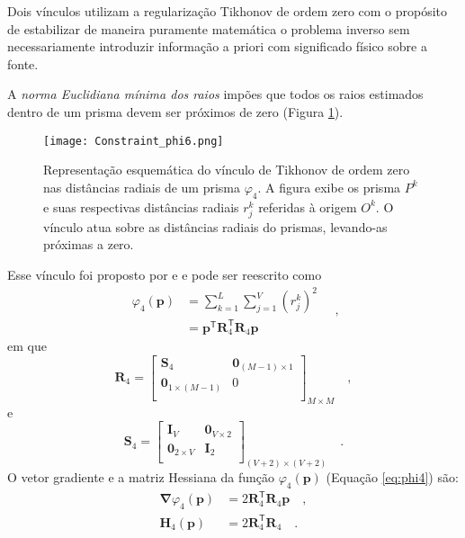 Dois vínculos utilizam a regularização Tikhonov de ordem zero com o propósito de estabilizar de maneira puramente matemática o problema inverso sem necessariamente introduzir informação a priori com significado físico sobre a fonte. 

A \textit{norma Euclidiana mínima dos raios} impões que todos os raios estimados dentro de um prisma devem ser próximos de zero (Figura \ref{fig:phi4}).

\begin{figure}[!htb]
	\centering
	\texttt{[image: Constraint\_phi6.png]}
	\caption{Representação esquemática do vínculo de Tikhonov de ordem zero nas distâncias radiais de um prisma $\varphi_{4}$. A figura exibe os prisma $P^k$ e suas respectivas distâncias radiais $r_j^k$ referidas à origem $O^k$. O vínculo atua sobre as distâncias radiais do prismas, levando-as próximas a zero.}
	\label{fig:phi4}
\end{figure}

Esse vínculo foi proposto por \cite{oliveirajr_etal2011} e \cite{oliveirajr_barbosa2013} e pode ser reescrito como
\begin{equation}\label{eq:phi4}
\begin{split}
\varphi_{4}(\mathbf{p}) &= \sum\limits^{L}_{k=1}\sum\limits^{V}_{j=1}\left(r_{j}^{k}\right)^2 \\
&= \mathbf{p}^{\mathsf{T}} \mathbf{R}_{4}^{\mathsf{T}} \mathbf{R}_{4} \mathbf{p}
\end{split} \quad ,
\end{equation}
em que
\begin{equation}
\mathbf{R}_{4} = 
\begin{bmatrix}
\mathbf{S}_{4} & \mathbf{0}_{(M-1) \times 1} \\
\mathbf{0}_{1 \times (M-1)} & 0 \\
\end{bmatrix}_{M\times M} \quad ,
\label{eq:R4-matrix}
\end{equation}
e
\begin{equation}
\mathbf{S}_{4} = 
\begin{bmatrix}
\mathbf{I}_{V} & \mathbf{0}_{V \times 2} \\
\mathbf{0}_{2 \times V} & \mathbf{I}_{2} \\
\end{bmatrix}_{ (V+2)\times (V+2)} \quad .
\label{eq:S4-matrix}
\end{equation}
O vetor gradiente e a matriz Hessiana da função $\varphi_{4}(\mathbf{p})$ (Equação \ref{eq:phi4}) são:
\begin{equation}\label{eq:phi4_gh}
\begin{split}
\boldsymbol{\nabla}\varphi_{4}(\mathbf{p}) &= 2\mathbf{R}^\mathsf{T}_{4}\mathbf{R}_{4}\mathbf{p} \quad ,\\
\mathbf{H}_{4}(\mathbf{p}) &= 2\mathbf{R}^\mathsf{T}_{4}\mathbf{R}_{4} \quad .
\end{split}
\end{equation}

